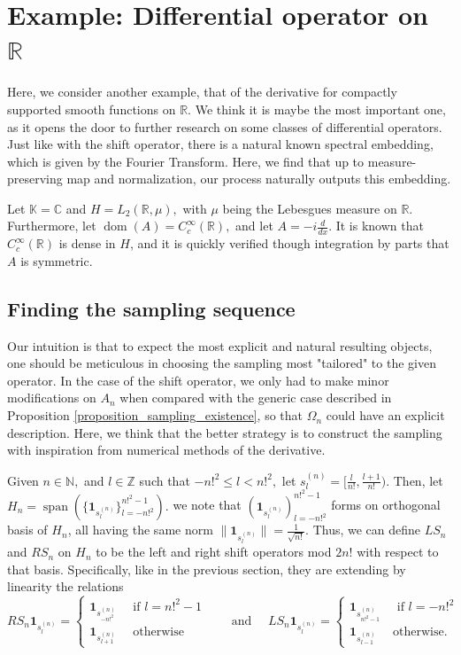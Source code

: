 \documentclass[10pt,a4paper]{amsart}
\def \Span{\operatorname{span}}
\def \Dom{\operatorname{dom}}
\begin{document}
\section{Example: Differential operator on $\mathbb{R}$}\label{section_differential} Here, we consider another example, that of the derivative for compactly supported smooth functions on $\mathbb{R}$. We think it is maybe the most important one, as it opens the door to further research on some classes of differential operators. Just like with the shift operator, there is a natural known spectral embedding, which is given by the Fourier Transform. Here, we find that up to measure-preserving map and normalization, our process naturally outputs this embedding.

Let $\mathbb{K}=\mathbb{C}$ and $H=L_2(\mathbb{R},\mu),$ with $\mu$ being the Lebesgues measure on $\mathbb{R}.$ Furthermore, let $\Dom(A)=C_c^{\infty}(\mathbb{R}),$ and let $A=-i\frac{d}{dx}.$ It is known that $C_c^{\infty}(\mathbb{R})$ is dense in $H$, and it is quickly verified though integration by parts that $A$ is symmetric.

\subsection{Finding the sampling sequence}\label{subsection_differential_sampling} Our intuition is that to expect the most explicit and natural resulting objects, one should be meticulous in choosing  the sampling most "tailored" to the given operator. In the case of the shift operator, we only had to make minor modifications on $A_n$ when compared with the generic case described in Proposition \ref{proposition_sampling_existence}, so that $\Omega_n$ could have an explicit description. Here, we think that the better strategy is to construct the sampling with inspiration from numerical methods of the derivative.

Given $n\in\mathbb{N},$ and $l\in\mathbb{Z}$ such that $-n!^2\leq l <n!^2,$ let $s_l^{(n)}=[\frac{l}{n!},\frac{l+1}{n!}).$  Then, let $H_n=\Span(\{\mathbf{1}_{s_l^{(n)}}\}_{l=-n!^2}^{n!^2-1}).$ we note that $(\mathbf{1}_{s_{l}^{(n)}})_{l=-n!^2}^{n!^2-1}$ forms on orthogonal basis of $H_n$, all having the same norm $\|\mathbf{1}_{s_{l}^{(n)}}\|=\frac{1}{\sqrt{n!}}.$ Thus, we can define $LS_n$ and $RS_n$ on $H_n$ to be the left and right shift operators mod $2n!$ with respect to that basis. Specifically, like in the previous section, they are extending by linearity the relations $$RS_n \mathbf{1}_{s_{l}^{(n)}} =\begin{cases}
	 \mathbf{1}_{s_{-n!^2}^{(n)}} \quad \text{ if $l=n!^2-1$ }\\
	 \mathbf{1}_{s_{l+1}^{(n)}} \quad \text{ otherwise }
\end{cases} \quad \text{ and }\quad LS_n\mathbf{1}_{s_{l}^{(n)}} =\begin{cases}
	\mathbf{1}_{s_{n!^2-1}^{(n)}} \quad \text{ if $l=-n!^2$ }\\
	\mathbf{1}_{s_{l-1}^{(n)}} \quad \text{ otherwise. }
\end{cases}$$
\end{document}
